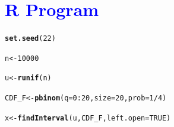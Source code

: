 \documentclass[11pt, a4paper]{article}\usepackage[]{graphicx}\usepackage[]{xcolor}
\makeatletter
\newcommand{\hlnum}[1]{\textcolor[rgb]{0.686,0.059,0.569}{#1}}%
\newcommand{\hlopt}[1]{\textcolor[rgb]{0,0,0}{#1}}%
\newcommand{\hldef}[1]{\textcolor[rgb]{0.345,0.345,0.345}{#1}}%
\newcommand{\hlkwb}[1]{\textcolor[rgb]{0.69,0.353,0.396}{#1}}%
\newcommand{\hlkwc}[1]{\textcolor[rgb]{0.333,0.667,0.333}{#1}}%
\newcommand{\hlkwd}[1]{\textcolor[rgb]{0.737,0.353,0.396}{\textbf{#1}}}%
\newenvironment{kframe}{%
 \def\at@end@of@kframe{}%
 \ifinner\ifhmode%
  \def\at@end@of@kframe{\end{minipage}}%
  \begin{minipage}{\columnwidth}%
 \fi\fi%
 \def\FrameCommand##1{\hskip\@totalleftmargin \hskip-\fboxsep
 \colorbox{shadecolor}{##1}\hskip-\fboxsep
     \hskip-\linewidth \hskip-\@totalleftmargin \hskip\columnwidth}%
 \MakeFramed {\advance\hsize-\width
   \@totalleftmargin\z@ \linewidth\hsize
   \@setminipage}}%
 {\par\unskip\endMakeFramed%
 \at@end@of@kframe}
\newenvironment{knitrout}{}{} %
\makeatother
\begin{document}
\section*{\faArrowAltCircleRight[regular] \textcolor{blue}{R Program}}

\begin{knitrout}
\color{fgcolor}\begin{kframe}
\begin{alltt}
\hlkwd{set.seed}\hldef{(}\hlnum{22}\hldef{)}
\end{alltt}
\end{kframe}
\end{knitrout}

\begin{knitrout}
\color{fgcolor}\begin{kframe}
\begin{alltt}
\hldef{n} \hlkwb{<-} \hlnum{10000}
\end{alltt}
\end{kframe}
\end{knitrout}

\begin{knitrout}
\color{fgcolor}\begin{kframe}
\begin{alltt}
\hldef{u} \hlkwb{<-} \hlkwd{runif}\hldef{(n)}
\end{alltt}
\end{kframe}
\end{knitrout}

\begin{knitrout}
\color{fgcolor}\begin{kframe}
\begin{alltt}
\hldef{CDF_F} \hlkwb{<-} \hlkwd{pbinom}\hldef{(}\hlkwc{q} \hldef{=} \hlnum{0}\hlopt{:}\hlnum{20}\hldef{,} \hlkwc{size} \hldef{=} \hlnum{20}\hldef{,} \hlkwc{prob} \hldef{=} \hlnum{1}\hlopt{/}\hlnum{4}\hldef{)}
\end{alltt}
\end{kframe}
\end{knitrout}

\begin{knitrout}
\color{fgcolor}\begin{kframe}
\begin{alltt}
\hldef{x} \hlkwb{<-} \hlkwd{findInterval}\hldef{(u, CDF_F,} \hlkwc{left.open} \hldef{=} \hlnum{TRUE}\hldef{)}
\end{alltt}
\end{kframe}
\end{knitrout}
\end{document}
